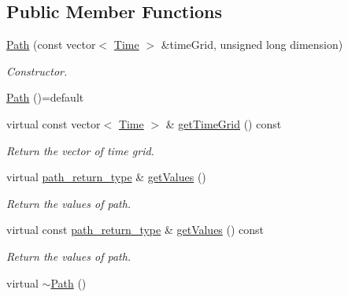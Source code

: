 \subsection*{Public Member Functions}
\begin{DoxyCompactItemize}
\item 
\hyperlink{class_path_ab0fff5e8514331bba55ab5745fc485a4}{Path} (const vector$<$ \hyperlink{_name_def_8h_ac2d3e0ba793497bcca555c7c2cf64ff3}{Time} $>$ \&time\+Grid, unsigned long dimension)
\begin{DoxyCompactList}\small\item\em Constructor. \end{DoxyCompactList}\item 
\hyperlink{class_path_a8437fecb95fe145057c957feb8b8955a}{Path} ()=default
\item 
virtual const vector$<$ \hyperlink{_name_def_8h_ac2d3e0ba793497bcca555c7c2cf64ff3}{Time} $>$ \& \hyperlink{class_path_a511b7a93c62893bcafba4749ad1dd1b3}{get\+Time\+Grid} () const
\begin{DoxyCompactList}\small\item\em Return the vector of time grid. \end{DoxyCompactList}\item 
virtual \hyperlink{class_path_a3b1c34a87f7867f6fed2e0a33f801e7d}{path\+\_\+return\+\_\+type} \& \hyperlink{class_path_a8ba07fadae45801824240317c311bb84}{get\+Values} ()
\begin{DoxyCompactList}\small\item\em Return the values of path. \end{DoxyCompactList}\item 
virtual const \hyperlink{class_path_a3b1c34a87f7867f6fed2e0a33f801e7d}{path\+\_\+return\+\_\+type} \& \hyperlink{class_path_a2490ad69198170463f98c7d8f7212917}{get\+Values} () const
\begin{DoxyCompactList}\small\item\em Return the values of path. \end{DoxyCompactList}\item 
virtual \hyperlink{class_path_a83933167b70441af12427b23d88b0447}{$\sim$\+Path} ()
\end{DoxyCompactItemize}

